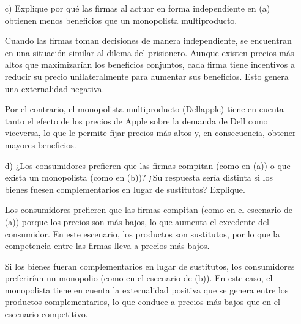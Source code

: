 \documentclass{exam}
\begin{document}
\begin{itemize}
    \item[c)] Explique por qué las firmas al actuar en forma independiente en (a) obtienen menos beneficios que un monopolista multiproducto.
    \begin{solution}
        Cuando las firmas toman decisiones de manera independiente, se encuentran en una situación similar al dilema del prisionero. Aunque existen precios más altos que maximizarían los beneficios conjuntos, cada firma tiene incentivos a reducir su precio unilateralmente para aumentar sus beneficios. Esto genera una externalidad negativa.

        Por el contrario, el monopolista multiproducto (Dellapple) tiene en cuenta tanto el efecto de los precios de Apple sobre la demanda de Dell como viceversa, lo que le permite fijar precios más altos y, en consecuencia, obtener mayores beneficios.
    \end{solution}

    \item[d)] ¿Los consumidores prefieren que las firmas compitan (como en (a)) o que exista un monopolista (como en (b))? ¿Su respuesta sería distinta si los bienes fuesen complementarios en lugar de sustitutos? Explique.
    \begin{solution}
        Los consumidores prefieren que las firmas compitan (como en el escenario de (a)) porque los precios son más bajos, lo que aumenta el excedente del consumidor. En este escenario, los productos son sustitutos, por lo que la competencia entre las firmas lleva a precios más bajos.

        Si los bienes fueran complementarios en lugar de sustitutos, los consumidores preferirían un monopolio (como en el escenario de (b)). En este caso, el monopolista tiene en cuenta la externalidad positiva que se genera entre los productos complementarios, lo que conduce a precios más bajos que en el escenario competitivo.
    \end{solution}
\end{itemize}
\end{document}
